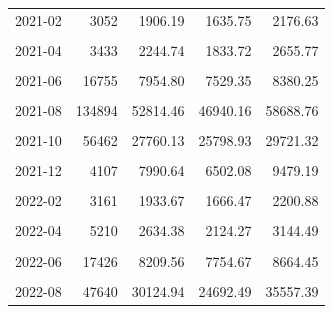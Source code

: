 \begin{longtable}[t]{crrrr}
2021-02 & 3052 & 1906.19 & 1635.75 & 2176.63\\
\cellcolor{gray!10}{2021-03} & \cellcolor{gray!10}{2908} & \cellcolor{gray!10}{2192.69} & \cellcolor{gray!10}{1880.58} & \cellcolor{gray!10}{2504.80}\\
2021-04 & 3433 & 2244.74 & 1833.72 & 2655.77\\
\cellcolor{gray!10}{2021-05} & \cellcolor{gray!10}{8895} & \cellcolor{gray!10}{4652.97} & \cellcolor{gray!10}{4337.23} & \cellcolor{gray!10}{4968.71}\\
2021-06 & 16755 & 7954.80 & 7529.35 & 8380.25\\
\cellcolor{gray!10}{2021-07} & \cellcolor{gray!10}{28207} & \cellcolor{gray!10}{17128.58} & \cellcolor{gray!10}{13750.28} & \cellcolor{gray!10}{20506.88}\\
2021-08 & 134894 & 52814.46 & 46940.16 & 58688.76\\
\cellcolor{gray!10}{2021-09} & \cellcolor{gray!10}{125524} & \cellcolor{gray!10}{51894.58} & \cellcolor{gray!10}{49623.83} & \cellcolor{gray!10}{54165.33}\\
2021-10 & 56462 & 27760.13 & 25798.93 & 29721.32\\
\cellcolor{gray!10}{2021-11} & \cellcolor{gray!10}{9491} & \cellcolor{gray!10}{13800.09} & \cellcolor{gray!10}{11778.64} & \cellcolor{gray!10}{15821.55}\\
2021-12 & 4107 & 7990.64 & 6502.08 & 9479.19\\
\cellcolor{gray!10}{2022-01} & \cellcolor{gray!10}{4782} & \cellcolor{gray!10}{3135.97} & \cellcolor{gray!10}{2780.15} & \cellcolor{gray!10}{3491.79}\\
2022-02 & 3161 & 1933.67 & 1666.47 & 2200.88\\
\cellcolor{gray!10}{2022-03} & \cellcolor{gray!10}{2598} & \cellcolor{gray!10}{2134.20} & \cellcolor{gray!10}{1814.28} & \cellcolor{gray!10}{2454.11}\\
2022-04 & 5210 & 2634.38 & 2124.27 & 3144.49\\
\cellcolor{gray!10}{2022-05} & \cellcolor{gray!10}{13834} & \cellcolor{gray!10}{6931.96} & \cellcolor{gray!10}{6230.79} & \cellcolor{gray!10}{7633.13}\\
2022-06 & 17426 & 8209.56 & 7754.67 & 8664.45\\
\cellcolor{gray!10}{2022-07} & \cellcolor{gray!10}{18950} & \cellcolor{gray!10}{12714.23} & \cellcolor{gray!10}{10337.01} & \cellcolor{gray!10}{15091.46}\\
2022-08 & 47640 & 30124.94 & 24692.49 & 35557.39\\

\end{longtable}
